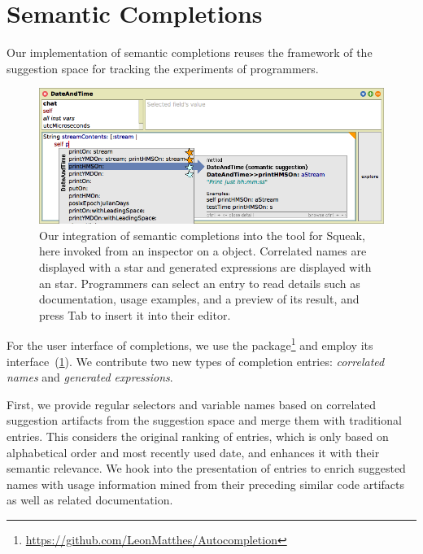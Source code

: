 
\section{Semantic Completions}
\label{sec:implementation/completions}

Our implementation of semantic completions reuses the framework of the suggestion space for tracking the experiments of programmers.

\begin{figure}[b]
	\centering
	\includegraphics[width=\textwidth]{02_completions/screenshot.png} %
	\caption[Integration of semantic completions into the  tool for Squeak.]{
		Our integration of semantic completions into the  tool for Squeak, here invoked from an inspector on a  object.
		Correlated names are displayed with a \bold{\textcolor[HTML]{598db3}{blue}} star and generated expressions are displayed with an \bold{\textcolor{orange!80!black}{orange}} star.
		Programmers can select an entry to read details such as documentation, usage examples, and a preview of its result, and press Tab to insert it into their editor.
	}
	\label{fig:implementation/completions}
\end{figure}

For the user interface of completions, we use the  package\footnote{\url{https://github.com/LeonMatthes/Autocompletion}} and employ its  interface~(\cref{fig:implementation/completions}).
We contribute two new types of completion entries: \emph{correlated names} and \emph{generated expressions}.

First, we provide regular selectors and variable names based on correlated suggestion artifacts from the suggestion space and merge them with traditional  entries.
This considers the original ranking of entries, which is only based on alphabetical order and most recently used date, and enhances it with their semantic relevance.
We hook into the presentation of entries to enrich suggested names with usage information mined from their preceding similar code artifacts as well as related documentation.

